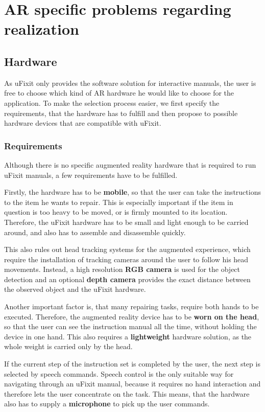 
\chapter{AR specific problems regarding realization}

\section{Hardware}
\label{sec:hardware}
As uFixit only provides the software solution for interactive manuals, the user is free to choose which kind of AR hardware he would like to choose for the application. To make the selection process easier, we first specify the requirements, that the hardware has to fulfill and then propose to possible hardware devices that are compatible with uFixit.

\subsection{Requirements}
Although there is no specific augmented reality hardware that is required to run uFixit manuals, a few requirements have to be fulfilled.

Firstly, the hardware has to be \textbf{mobile}, so that the user can take the instructions to the item he wants to repair. This is especially important if the item in question is too heavy to be moved, or is firmly mounted to its location. Therefore, the uFixit hardware has to be small and light enough to be carried around, and also has to assemble and disassemble quickly.

This also rules out head tracking systems for the augmented experience, which require the installation of tracking cameras around the user to follow his head movements. Instead, a high resolution \textbf{RGB camera} is used for the object detection and an optional \textbf{depth camera} provides the exact distance between the observed object and the uFixit hardware.

Another important factor is, that many repairing tasks, require both hands to be executed. Therefore, the augmented reality device has to be \textbf{worn on the head}, so that the user can see the instruction manual all the time, without holding the device in one hand. This also requires a \textbf{lightweight} hardware solution, as the whole weight is carried only by the head.

If the current step of the instruction set is completed by the user, the next step is selected by speech commands. Speech control is the only suitable way for navigating through an uFixit manual, because it requires no hand interaction and therefore lets the user concentrate on the task. This means, that the hardware also has to supply a \textbf{microphone} to pick up the user commands.

